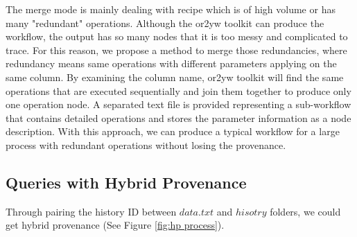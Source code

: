 The merge mode is mainly dealing with recipe which is of high volume or has many "redundant" operations. Although the or2yw toolkit can produce the workflow, the output has so many nodes that it is too messy and complicated to trace. For this reason, we propose a method to merge those redundancies, where redundancy means same operations with different parameters applying on the same column. By examining the column name, or2yw toolkit will find the same operations that are executed sequentially and join them together to produce only one operation node. A separated text file is provided representing a sub-workflow that contains detailed operations and stores the parameter information as a node description. With this approach, we can produce a typical workflow for a large process with redundant operations without losing the provenance. 



\subsection{Queries with Hybrid Provenance}

Through pairing the history ID between $data.txt$ and $hisotry$ folders, we could get hybrid provenance (See Figure \ref{fig:hp process}).



